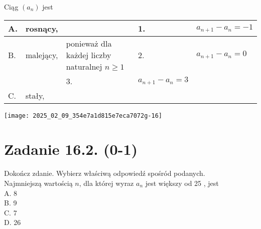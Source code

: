 \documentclass[10pt]{article}
\begin{document}
Ciąg \(\left(a_{n}\right)\) jest

\begin{center}
\begin{tabular}{|l|l|l|l|l|}
\hline
A. & rosnący, &  & 1. & \(a_{n+1}-a_{n}=-1\) \\
\hline
B. & malejący, & ponieważ dla każdej liczby naturalnej \(n \geq 1\) & 2. & \(a_{n+1}-a_{n}=0\) \\
\cline { 1 - 1 }
 &  & 3. & \(a_{n+1}-a_{n}=3\) &  \\
\hline
C. & stały, &  &  &  \\
\hline
\end{tabular}
\end{center}

\begin{center}
\texttt{[image: 2025\_02\_09\_354e7a1d815e7eca7072g-16]}
\end{center}

\section*{Zadanie 16.2. (0-1)}
Dokończ zdanie. Wybierz właściwą odpowiedź spośród podanych.\\
Najmniejszą wartością \(n\), dla której wyraz \(a_{n}\) jest większy od 25 , jest\\
A. 8\\
B. 9\\
C. 7\\
D. 26
\end{document}
